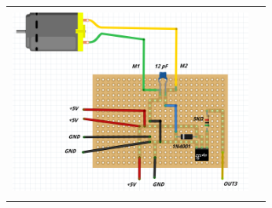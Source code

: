 \documentclass[12]{article}
\newenvironment{Figure}
{\par\medskip\noindent\minipage{\linewidth}}
{\endminipage\par\medskip}
\begin{document}
\begin{multicols}{2}
\begin{Figure}
\center
\begin{tabular}{|l|r|}
\hline
\\
\includegraphics[width=8cm, height=6cm]{img/F8.png}  \\\\ \hline
\end{tabular}
\label{fig:perfo_sis_con}
\end{Figure}


\end{multicols}
\end{document}
